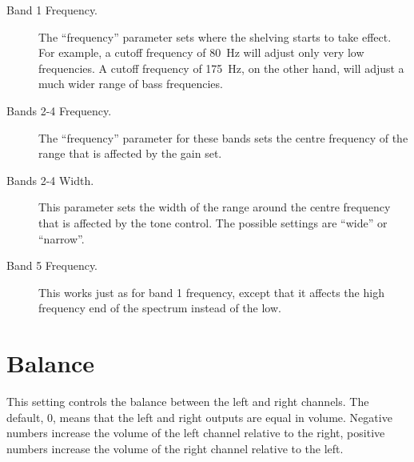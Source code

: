 {  \begin{description}
    \item[Band 1 Frequency.]
        The ``frequency'' parameter sets where the shelving starts to take
        effect. For example, a cutoff frequency of 80~Hz will adjust only very
        low frequencies. A cutoff frequency of 175~Hz, on the other hand, will
        adjust a much wider range of bass frequencies.
  \item[Bands 2-4 Frequency.]
        The ``frequency'' parameter for these bands sets the centre frequency of
        the range that is affected by the gain set.
  \item[Bands 2-4 Width.]
        This parameter sets the width of the range around the centre frequency
        that is affected by the tone control. The possible settings are
        ``wide'' or ``narrow''.
  \item[Band 5 Frequency.]
        This works just as for band 1 frequency, except that it affects the
        high frequency end of the spectrum instead of the low.
  \end{description}

}

\section{Balance}
  This setting controls the balance between the left and right channels. The
  default, 0, means that the left and right outputs are equal in volume.
  Negative numbers increase the volume of the left channel relative to the
  right, positive numbers increase the volume of the right channel relative
  to the left.

